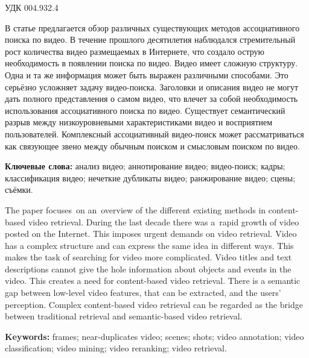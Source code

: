 
\noindent УДК 004.932.4



{\small

В статье предлагается обзор различных существующих методов
ассоциативного поиска по видео.
В течение прошлого десятилетия наблюдался стремительный рост
количества видео размещаемых в Интернете,
что создало острую необходимость в появлении поиска по видео.
Видео имеет сложную структуру. Одна и та же информация
может быть выражен различными способами.
Это серьёзно усложняет задачу видео-поиска.
Заголовки и описания видео не могут
дать полного представления о самом видео,
что влечет за собой необходимость использования
ассоциативного поиска по видео.
Существует семантический разрыв между низкоуровневыми
характеристиками видео и восприятием пользователей.
Комплексный ассоциативный видео-поиск
может рассматриваться как связующее звено между обычным поиском
и смысловым поиском по видео.

{\bf Ключевые слова:}
анализ видео;
аннотирование видео;
видео-поиск;
кадры;
классификация видео;
нечеткие дубликаты видео;
ранжирование видео;
сцены;
съёмки.

}



{\small

The paper focuses on an overview of the different existing methods
in content-based video retrieval.
During the last decade there was a~rapid growth
of video posted on the Internet.
This imposes urgent demands on video retrieval.
Video has a complex structure and can express the same idea
in different ways. This makes the task of searching for video more complicated.
Video titles and text descriptions cannot give the hole information
about objects and events in the video.
This creates a need for content-based video retrieval.
There is a semantic gap between low-level video features,
that can be extracted, and the users' perception.
Complex content-based video retrieval
can be regarded as the bridge between traditional retrieval
and semantic-based video retrieval.


{\bf Keywords:}
frames;
near-duplicates video;
scenes;
shots;
video annotation;
video classification;
video mining;
video reranking;
video retrieval.

}




